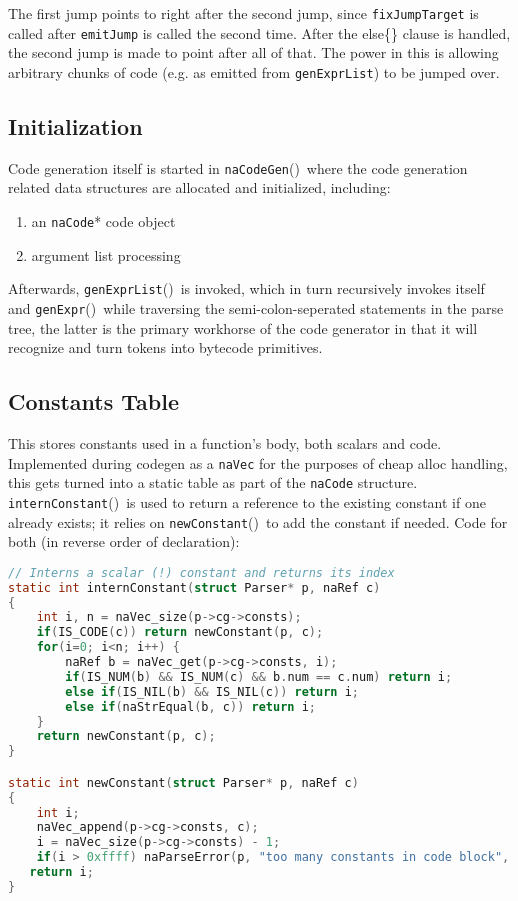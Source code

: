 \documentclass{article}
\newcommand{\type}[1]{\textcolor{type}{\tt #1}}
\newcommand{\func}[1]{\textcolor{func}{\tt #1}}
\newcommand{\nasalapi}[1]{\func{#1}}
\newcommand{\nasalkeyword}[1]{\textcolor{keyword}{#1}}
\newcommand{\br}{\penalty3}
\newcommand{\fp}{\textcolor{func}{()}}
\begin{document}
The first jump points to right after the second jump, since \nasalapi{fix\br Jump\br Target} is called after \nasalapi{emit\br Jump} is called the second time.  After the \nasalkeyword{else}\{\} clause is handled, the second jump is made to point after all of that.  The power in this is allowing arbitrary chunks of code (e.g. as emitted from \nasalapi{gen\br Expr\br List}) to be jumped over.

\subsection{Initialization}

Code generation itself is started in \nasalapi{na\br Code\br Gen}\fp\ where the code generation related data structures are allocated and initialized, including:

\begin{enumerate}
\item an \type{naCode}* code object
\item argument list processing
\end{enumerate}

Afterwards, \nasalapi{gen\br Expr\br List}\fp\ is invoked, which in turn recursively invokes itself and \nasalapi{gen\br Expr}\fp\ while traversing the semi-colon-seperated statements in the parse tree, the latter is the primary workhorse of the code generator in that it will recognize and turn tokens into bytecode primitives.

\subsection{Constants Table}

This stores constants used in a function's body, both scalars and code. Implemented during codegen as a \type{naVec} for the purposes of cheap alloc handling, this gets turned into a static table as part of the \type{naCode} structure.  \nasalapi{internConstant}\fp\ is used to return a reference to the existing constant if one already exists; it relies on \nasalapi{newConstant}\fp\ to add the constant if needed.  Code for both (in reverse order of declaration):

\begin{lstlisting}[language=C]
// Interns a scalar (!) constant and returns its index
static int internConstant(struct Parser* p, naRef c)
{
    int i, n = naVec_size(p->cg->consts);
    if(IS_CODE(c)) return newConstant(p, c);
    for(i=0; i<n; i++) {
        naRef b = naVec_get(p->cg->consts, i);
        if(IS_NUM(b) && IS_NUM(c) && b.num == c.num) return i;
        else if(IS_NIL(b) && IS_NIL(c)) return i;
        else if(naStrEqual(b, c)) return i;
    }
    return newConstant(p, c);
}

static int newConstant(struct Parser* p, naRef c)
{
    int i;
    naVec_append(p->cg->consts, c);
    i = naVec_size(p->cg->consts) - 1;
    if(i > 0xffff) naParseError(p, "too many constants in code block", 0);
   return i;
}
\end{lstlisting}
\end{document}
